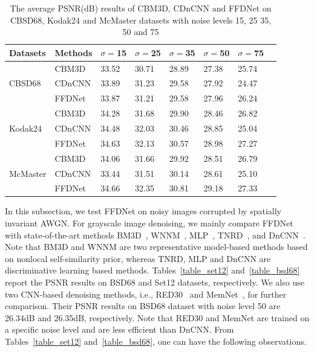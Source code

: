 \documentclass[journal]{IEEEtran}
\begin{document}
\begin{table}[!bp]\footnotesize{}
\caption{The average PSNR(dB) results of CBM3D, CDnCNN and FFDNet on CBSD68, Kodak24 and McMaster datasets with noise levels 15, 25 35, 50 and 75}
\center
\begin{tabular}{|p{1cm}<{\centering}|p{0.96cm}<{\centering}|p{.76cm}<{\centering}|p{.76cm}<{\centering}|p{.76cm}<{\centering}|p{.76cm}<{\centering}|p{.76cm}<{\centering}|p{.76cm}<{\centering}|}
  \hline\rowcolor[gray]{.9}
  Datasets & Methods &$\sigma$$=$15&  $\sigma$$=$25& $\sigma$$=$35  & $\sigma$$=$50 & $\sigma$$=$75 \\ \hline
   &CBM3D    & 33.52    & 30.71 &  28.89 & 27.38 & 25.74 \\
 CBSD68  &{CDnCNN} &33.89 &  31.23    & 29.58 & 27.92   & 24.47\\
  &FFDNet &33.87 &  31.21    & 29.58 & 27.96   & 26.24\\\hline

    & CBM3D   & 34.28    & 31.68 &  29.90 & 28.46 & 26.82 \\
    Kodak24 &{CDnCNN} &34.48 &  32.03    & 30.46 & 28.85   & 25.04\\
   & FFDNet&34.63 &  32.13    & 30.57 & 28.98   & 27.27\\\hline

  & CBM3D   & 34.06    & 31.66 &  29.92 & 28.51 & 26.79 \\
McMaster &{CDnCNN} &33.44 &  31.51    & 30.14 & 28.61  & 25.10\\
  & FFDNet  &34.66 &  32.35   & 30.81 & 29.18   & 27.33\\\hline
\end{tabular}
\label{table3}
\end{table}

In this subsection, we test FFDNet on noisy images corrupted by spatially invariant AWGN. For grayscale image denoising, we mainly compare FFDNet with state-of-the-art methods BM3D~\cite{dabov2007image}, WNNM~\cite{gu2014weighted}, MLP~\cite{burger2012image}, TNRD~\cite{chen2015trainable}, and DnCNN~\cite{zhang2017beyond}.
Note that BM3D and WNNM are two representative model-based methods based on nonlocal self-similarity prior, whereas TNRD, MLP and DnCNN are discriminative learning based methods. Tables~\ref{table_set12} and~\ref{table_bsd68} report the PSNR results on BSD68 and Set12 datasets, respectively.
We also use two CNN-based denoising methods, i.e., RED30~\cite{mao2016} and MemNet~\cite{tai2017memnet}, for further comparison. Their PSNR results on BSD68 dataset with noise level 50 are 26.34dB and 26.35dB, respectively. Note that RED30 and MemNet are trained on a specific noise level and are less efficient than DnCNN.
From Tables~\ref{table_set12} and~\ref{table_bsd68}, one can have the following observations.
\end{document}
